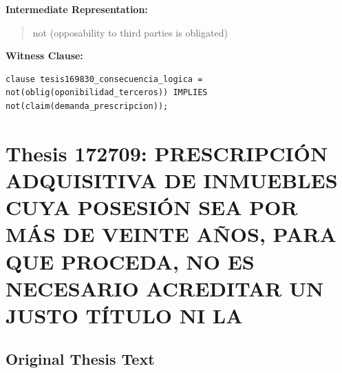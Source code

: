 \documentclass[11pt,a4paper]{article}
\begin{document}
\textbf{Intermediate Representation:}

\begin{quote}
not (opposability to third parties is obligated)
\end{quote}

\textbf{Witness Clause:}

\begin{lstlisting}[style=witnessstyle, language=Witness]
clause tesis169830_consecuencia_logica = not(oblig(oponibilidad_terceros)) IMPLIES not(claim(demanda_prescripcion));
\end{lstlisting}

\newpage

\section{Thesis 172709: PRESCRIPCIÓN ADQUISITIVA DE INMUEBLES CUYA POSESIÓN SEA POR MÁS DE VEINTE AÑOS, PARA QUE PROCEDA, NO ES NECESARIO ACREDITAR UN JUSTO TÍTULO NI LA}
\label{thesis:172709}

\subsection{Original Thesis Text}
\end{document}
